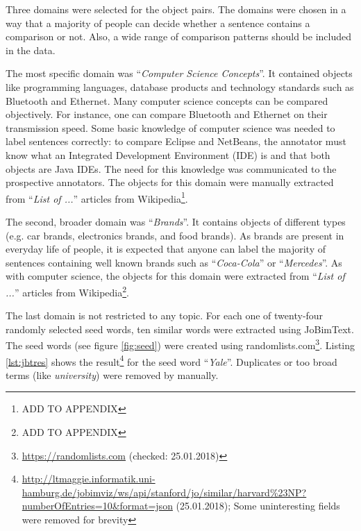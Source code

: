 Three domains were selected for the object pairs. The domains were chosen in a way that a majority of people can decide whether a sentence contains a comparison or not. Also, a wide range of comparison patterns should be included in the data.

The most specific domain was \enquote{\emph{Computer Science Concepts}}. It contained objects like programming languages, database products and technology standards such as Bluetooth and Ethernet.  Many computer science concepts can be compared objectively. For instance, one can compare Bluetooth and Ethernet on their transmission speed. Some basic knowledge of computer science was needed to label sentences correctly: to compare Eclipse and NetBeans, the annotator must know what an Integrated Development Environment (IDE) is and that both objects are Java IDEs.  The need for this knowledge was communicated to the prospective annotators. The objects for this domain were manually extracted from \enquote{\emph{List of ...}} articles from Wikipedia\footnote{ADD TO APPENDIX}.

The second, broader domain was \enquote{\emph{Brands}}. It contains objects of different types (e.g. car brands, electronics brands, and food brands). As brands are present in everyday life of people, it is expected that anyone can label the majority of sentences containing well known brands such as \enquote{\emph{Coca-Cola}} or \enquote{\emph{Mercedes}}. As with computer science, the objects for this domain were extracted from \enquote{\emph{List of ...}} articles from Wikipedia\footnote{ADD TO APPENDIX}.

The last domain is not restricted to any topic. For each one of twenty-four randomly selected seed words, ten similar words were extracted using JoBimText. The seed words (see figure \ref{fig:seed}) were created using randomlists.com\footnote{\url{https://randomlists.com}  (checked: 25.01.2018)}. Listing \ref{lst:jbtres} shows the result\footnote{\url{http://ltmaggie.informatik.uni-hamburg.de/jobimviz/ws/api/stanford/jo/similar/harvard\%23NP?numberOfEntries=10&format=json} (25.01.2018); Some uninteresting fields were removed for brevity} for the seed word \enquote{\emph{Yale}}. Duplicates or too broad terms (like \emph{university}) were removed by manually.

